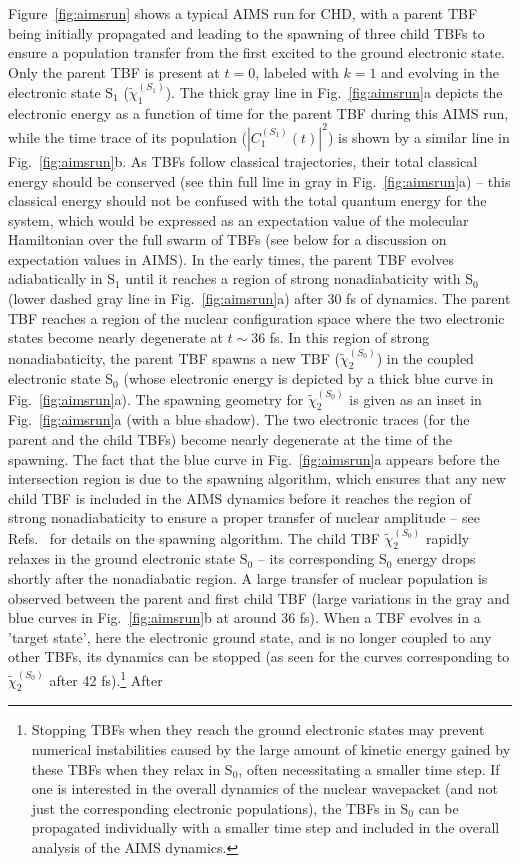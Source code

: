 \documentclass[9pt,bestpractices,pubversion]{livecoms}
\begin{document}
Figure~\ref{fig:aimsrun} shows a typical AIMS run for CHD, with a parent TBF being initially propagated and leading to the spawning of three child TBFs to ensure a population transfer from the first excited to the ground electronic state. Only the parent TBF is present at $t=0$, labeled with $k=1$ and evolving in the electronic state S$_1$ ($\tilde{\chi}_{1}^{(S_1)}$). The thick gray line in Fig.~\ref{fig:aimsrun}a depicts the electronic energy as a function of time for the parent TBF during this AIMS run, while the time trace of its population ($|C_{1}^{(S_1)}(t)|^2$) is shown by a similar line in Fig.~\ref{fig:aimsrun}b. As TBFs follow classical trajectories, their total classical energy should be conserved (see thin full line in gray in Fig.~\ref{fig:aimsrun}a) -- this classical energy should not be confused with the total quantum energy for the system, which would be expressed as an expectation value of the molecular Hamiltonian over the full swarm of TBFs (see below for a discussion on expectation values in AIMS). In the early times, the parent TBF evolves adiabatically in S$_1$ until it reaches a region of strong nonadiabaticity with S$_0$ (lower dashed gray line in Fig.~\ref{fig:aimsrun}a) after 30 fs of dynamics. The parent TBF reaches a region of the nuclear configuration space where the two electronic states become nearly degenerate at $t\sim36$ fs. In this region of strong nonadiabaticity, the parent TBF spawns a new TBF ($\tilde{\chi}_{2}^{(S_0)}$) in the coupled electronic state S$_0$ (whose electronic energy is depicted by a thick blue curve in Fig.~\ref{fig:aimsrun}a). The spawning geometry for $\tilde{\chi}_{2}^{(S_0)}$ is given as an inset in Fig.~\ref{fig:aimsrun}a (with a blue shadow). The two electronic traces (for the parent and the child TBFs) become nearly degenerate at the time of the spawning. The fact that the blue curve in Fig.~\ref{fig:aimsrun}a appears before the intersection region is due to the spawning algorithm, which ensures that any new child TBF is included in the AIMS dynamics before it reaches the region of strong nonadiabaticity to ensure a proper transfer of nuclear amplitude -- see Refs.~ for details on the spawning algorithm. The child TBF $\tilde{\chi}_{2}^{(S_0)}$ rapidly relaxes in the ground electronic state S$_0$ -- its corresponding S$_0$ energy drops shortly after the nonadiabatic region. A large transfer of nuclear population is observed between the parent and first child TBF (large variations in the gray and blue curves in Fig.~\ref{fig:aimsrun}b at around 36 fs). When a TBF evolves in a 'target state', here the electronic ground state, and is no longer coupled to any other TBFs, its dynamics can be stopped (as seen for the curves corresponding to $\tilde{\chi}_{2}^{(S_0)}$ after 42 fs).\footnote{Stopping TBFs when they reach the ground electronic states may prevent numerical instabilities caused by the large amount of kinetic energy gained by these TBFs when they relax in S$_0$, often necessitating a smaller time step. If one is interested in the overall dynamics of the nuclear wavepacket (and not just the corresponding electronic populations), the TBFs in S$_0$ can be propagated individually with a smaller time step and included in the overall analysis of the AIMS dynamics.} After 
\end{document}
